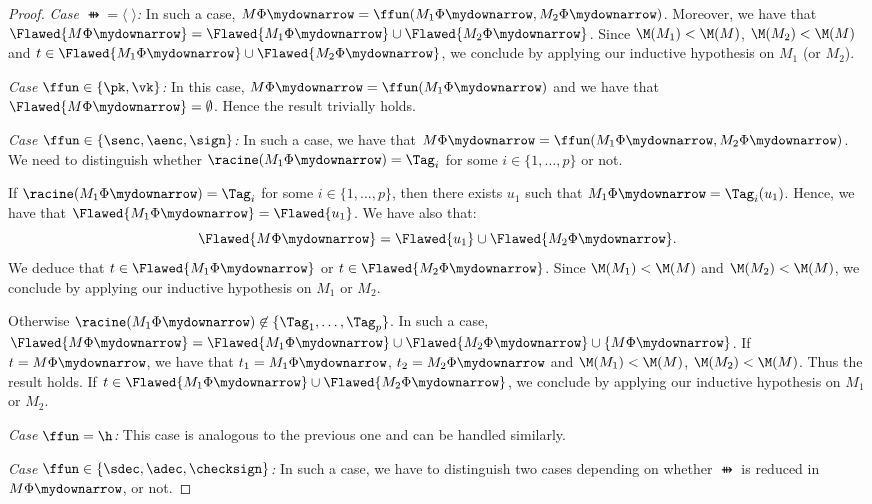 \begin{proof}
 \emph{Case $\ffun = \langle\;\rangle$:} In such a case, $M\Phi\mydownarrow =
 \ffun(M_1\Phi\mydownarrow, M_2\Phi\mydownarrow)$. Moreover, we have
 that 
$\Flawed{M\Phi\mydownarrow} = \Flawed{M_1\Phi\mydownarrow} \cup
 \Flawed{M_2\Phi\mydownarrow}$. Since $\M(M_1) < \M(M)$, $\M(M_2) < \M(M)$ and
 $t \in \Flawed{M_1\Phi\mydownarrow} \cup \Flawed{M_2\Phi\mydownarrow}$, we
 conclude by applying our inductive hypothesis on $M_1$ (or $M_2$).

\smallskip{}

 \emph{Case $\ffun \in \{\pk, \vk\}$:} In this case, $M\Phi\mydownarrow =
 \ffun(M_1\Phi\mydownarrow)$ and we have
 that $\Flawed{M\Phi\mydownarrow} = \emptyset$. Hence the result trivially holds.

\smallskip{}
 
 \emph{Case $\ffun \in \{\senc, \aenc, \sign\}$:} In such a case, we
 have that
 $M\Phi\mydownarrow = \ffun(M_1\Phi\mydownarrow, M_2\Phi\mydownarrow)$. We need
 to distinguish whether $\racine(M_1\Phi\mydownarrow) = \Tag_i$ for
 some $i \in \{1,\ldots,p\}$ or not.

 If $\racine(M_1\Phi\mydownarrow) = \Tag_i$ for some $i \in
 \{1,\ldots, p\}$,  then there exists $u_1$ such that $M_1\Phi\mydownarrow =
 \Tag_i(u_1)$. Hence, we have that $\Flawed{M_1\Phi\mydownarrow} =
 \Flawed{u_1}$. We have also that:
\[
 \Flawed{M\Phi\mydownarrow} = \Flawed{u_1} \cup
 \Flawed{M_2\Phi\mydownarrow}.
\]
 We deduce that $t \in \Flawed{M_1\Phi\mydownarrow}$ or $t \in
 \Flawed{M_2\Phi\mydownarrow}$. Since $\M(M_1) < \M(M)$ and $\M(M_2) < \M(M)$,
 we conclude by applying our inductive hypothesis on $M_1$ or $M_2$.

 Otherwise $\racine(M_1\Phi\mydownarrow) \not\in \{\Tag_1, \ldots, \Tag_p\}$. In such a
 case, $\Flawed{M\Phi\mydownarrow} = \Flawed{M_1\Phi\mydownarrow} \cup
 \Flawed{M_2\Phi\mydownarrow} \cup \{M\Phi\mydownarrow\}$. If $t =
 M\Phi\mydownarrow$, we have that $t_1 = M_1\Phi\mydownarrow$, $t_2 =
 M_2\Phi\mydownarrow$ and $\M(M_1) < \M(M)$, $\M(M_2) < \M(M)$. Thus the result
 holds. If $t \in \Flawed{M_1\Phi\mydownarrow} \cup
 \Flawed{M_2\Phi\mydownarrow}$, we conclude by applying our inductive
 hypothesis on $M_1$ or $M_2$.


\smallskip{}

 \emph{Case $\ffun = \h$:} This case is analogous to the previous one and can
 be handled similarly.


\smallskip{}

 \emph{Case $\ffun \in \{\sdec, \adec, \checksign\}$:} In such a case,
 we have to distinguish two cases depending on whether $\ffun$ is reduced in
 $M\Phi\mydownarrow$, or not.


\end{proof}
